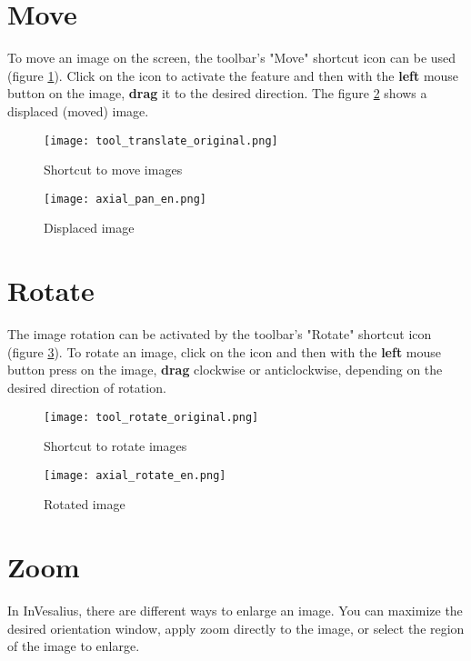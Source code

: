 \section{Move}

To move an image on the screen, the toolbar's "Move" shortcut icon can be used (figure
\ref{fig:move_icon}). Click on the icon to activate the feature and then with the \textbf{left} mouse button on the image, \textbf{drag} it to the desired direction. The figure \ref{fig:move_img} shows a displaced (moved) image.

\begin{figure}[!htb]
\centering
\texttt{[image: tool\_translate\_original.png]}
\caption{Shortcut to move images}
\label{fig:move_icon}
\end{figure}

\begin{figure}[!htb]
\centering
\texttt{[image: axial\_pan\_en.png]}
\caption{Displaced image}
\label{fig:move_img}
\end{figure}

\section{Rotate}

The image rotation can be activated by the toolbar's "Rotate" shortcut icon (figure \ref{fig:rot_icon}). To rotate an image, click on the icon and then with the \textbf{left} mouse button press on the image, \textbf{drag} clockwise or anticlockwise, depending on the desired direction of rotation.

\begin{figure}[!htb]
\centering
\texttt{[image: tool\_rotate\_original.png]}
\caption{Shortcut to rotate images}
\label{fig:rot_icon}
\end{figure}

\begin{figure}[!htb]
\centering
\texttt{[image: axial\_rotate\_en.png]}
\caption{Rotated image}
\label{fig:rotate_all}
\end{figure}

\section{Zoom}

In InVesalius, there are different ways to enlarge an image. You can maximize the desired orientation window, apply zoom directly to the image, or select the region of the image to enlarge.

